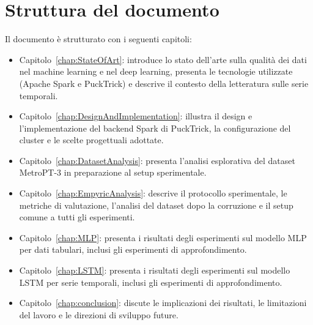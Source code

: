 \documentclass[../main.tex]{subfiles}
\begin{document}
\section{Struttura del documento}
Il documento è strutturato con i seguenti capitoli:
\begin{itemize}
    \item Capitolo~\ref{chap:StateOfArt}: introduce lo stato dell'arte sulla qualità dei dati nel machine learning e nel deep learning, presenta le tecnologie utilizzate (Apache Spark e PuckTrick) e descrive il contesto della letteratura sulle serie temporali.
    \item Capitolo~\ref{chap:DesignAndImplementation}: illustra il design e l'implementazione del backend Spark di PuckTrick, la configurazione del cluster e le scelte progettuali adottate.
    \item Capitolo~\ref{chap:DatasetAnalysis}: presenta l'analisi esplorativa del dataset MetroPT-3 in preparazione al setup sperimentale.
    \item Capitolo~\ref{chap:EmpyricAnalysis}: descrive il protocollo sperimentale, le metriche di valutazione, l'analisi del dataset dopo la corruzione e il setup comune a tutti gli esperimenti.
    \item Capitolo~\ref{chap:MLP}: presenta i risultati degli esperimenti sul modello MLP per dati tabulari, inclusi gli esperimenti di approfondimento.
    \item Capitolo~\ref{chap:LSTM}: presenta i risultati degli esperimenti sul modello LSTM per serie temporali, inclusi gli esperimenti di approfondimento.
    \item Capitolo~\ref{chap:conclusion}: discute le implicazioni dei risultati, le limitazioni del lavoro e le direzioni di sviluppo future.
\end{itemize}
\end{document}
